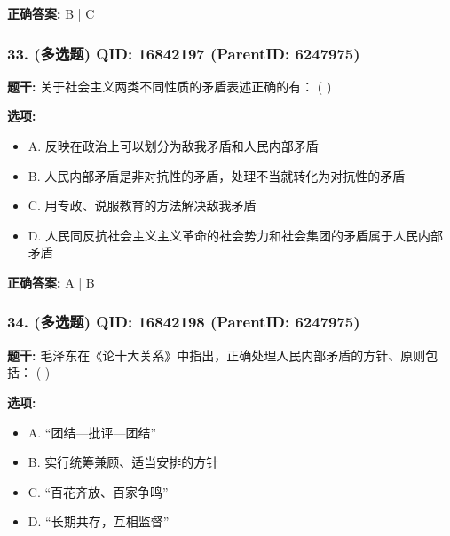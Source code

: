 \documentclass[12pt,UTF8]{ctexart}
\begin{document}
\textbf{正确答案:}
B | C

\vspace{0.3em}\hrulefill\vspace{0.7em}

\subsubsection*{33. (多选题) \small QID: 16842197 (ParentID: 6247975)}

\textbf{题干:}
关于社会主义两类不同性质的矛盾表述正确的有： ( )



\textbf{选项:}
\begin{itemize}[leftmargin=*]

  \item A. 反映在政治上可以划分为敌我矛盾和人民内部矛盾

  \item B. 人民内部矛盾是非对抗性的矛盾，处理不当就转化为对抗性的矛盾

  \item C. 用专政、说服教育的方法解决敌我矛盾

  \item D. 人民同反抗社会主义主义革命的社会势力和社会集团的矛盾属于人民内部矛盾

\end{itemize}

\textbf{正确答案:}
A | B

\vspace{0.3em}\hrulefill\vspace{0.7em}

\subsubsection*{34. (多选题) \small QID: 16842198 (ParentID: 6247975)}

\textbf{题干:}
毛泽东在《论十大关系》中指出，正确处理人民内部矛盾的方针、原则包括： ( )



\textbf{选项:}
\begin{itemize}[leftmargin=*]

  \item A. “团结—批评—团结”

  \item B. 实行统筹兼顾、适当安排的方针

  \item C. “百花齐放、百家争鸣”

  \item D. “长期共存，互相监督”

\end{itemize}
\end{document}

